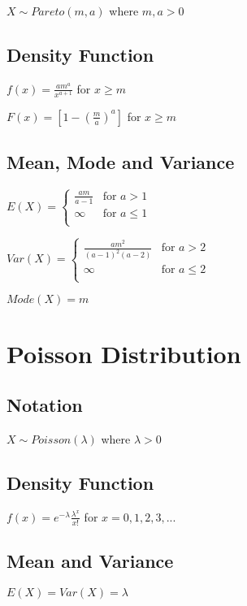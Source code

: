 \documentclass{article}
\begin{document}
\begin{multicols*}{3}
$X \sim Pareto(m, a)$ where $m, a > 0$

\subsection*{Density Function}

$f(x) = \frac{am^{a}}{x^{a+1}}$ for $x \geq m$

$F(x) = [1 - (\frac{m}{a})^{a}]$ for $x \geq m$

\subsection*{Mean, Mode and Variance}

$E(X) =
\begin{cases}
  \frac{am}{a-1} & \text{for } a > 1 \\
  \infty & \text{for } a \leq 1 \\
\end{cases}
$

$Var(X) =
\begin{cases}
  \frac{am^{2}}{(a-1)^{2}(a-2)} & \text{for } a > 2 \\
  \infty & \text{for } a \leq 2 \\
\end{cases}
$

$Mode(X) = m$

\section{Poisson Distribution}
\label{sec:poisson-dist}

\subsection*{Notation}

$X \sim Poisson(\lambda)$ where $\lambda > 0$

\subsection*{Density Function}

$f(x) = e^{-\lambda} \frac{\lambda^{x}}{x!}$ for $ x = 0, 1, 2, 3, ...$

\subsection*{Mean and Variance}

$E(X) = Var(X) = \lambda$

\end{multicols*}
\end{document}
